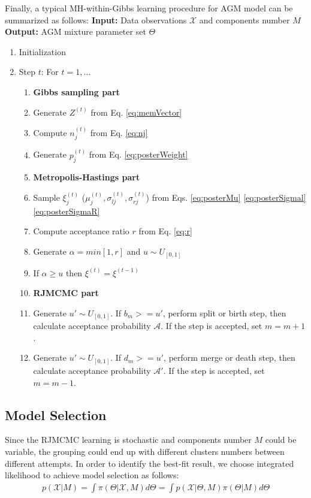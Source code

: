 \documentclass[conference]{IEEEtran}
\begin{document}
Finally, a typical MH-within-Gibbs learning procedure for AGM model can be summarized as follows:
\bigbreak
\noindent\textbf{Input:} Data observations $\mathcal{X}$ and components number $M$ \\
\textbf{Output:} AGM mixture parameter set $\Theta$
\bigbreak
\begin{enumerate}
\item Initialization
\item Step $t$: For $t = 1,\ldots$
\begin{enumerate}
\item[]\textbf{Gibbs sampling part}
\item Generate $Z^{(t)}$ from Eq. \eqref{eq:memVector}
\item Compute $n_j^{(t)}$ from Eq. \eqref{eq:nj}
\item Generate $p_j^{(t)}$ from Eq. \eqref{eq:posterWeight}
\item[] \textbf{Metropolis-Hastings part}
\item Sample $\xi_j^{(t)}$ ($\mu_j^{(t)}, \sigma_{lj}^{(t)}, \sigma_{rj}^{(t)}$) from Eqs. \eqref{eq:posterMu} \eqref{eq:posterSigmal} \eqref{eq:posterSigmaR}
\item Compute acceptance ratio $r$ from Eq. \eqref{eq:r}
\item Generate $\alpha = min[1,r]$ and $u \sim U_{[0,1]}$
\item If $\alpha \geq u$ then $\xi^{(t)} = \xi^{(t-1)}$
\item[] \textbf{RJMCMC part}
\item Generate $u' \sim U_{[0,1]}$. If $b_m>=u'$, perform split or birth step, then calculate acceptance probability $\mathcal{A}$. If the step is accepted, set $m=m+1$.
\item Generate $u' \sim U_{[0,1]}$. If $d_m>=u'$, perform merge or death step, then calculate acceptance probability $\mathcal{A}'$. If the step is accepted, set $m=m-1$.
\end{enumerate}
\end{enumerate}
\bigskip
\subsection{Model Selection}
Since the RJMCMC learning is stochastic and components number $M$ could be variable, the grouping could end up with different clusters numbers between different attempts. In order to identify the best-fit result, we choose integrated likelihood to achieve model selection as follows:
\begin{align}
p(\mathcal{X}|M) = \int\pi(\Theta|\mathcal{X},M)d\Theta = \int p(\mathcal{X}|\Theta,M)\pi(\Theta|M)d\Theta
\label{eq:margLikeli}
\end{align}
\end{document}
